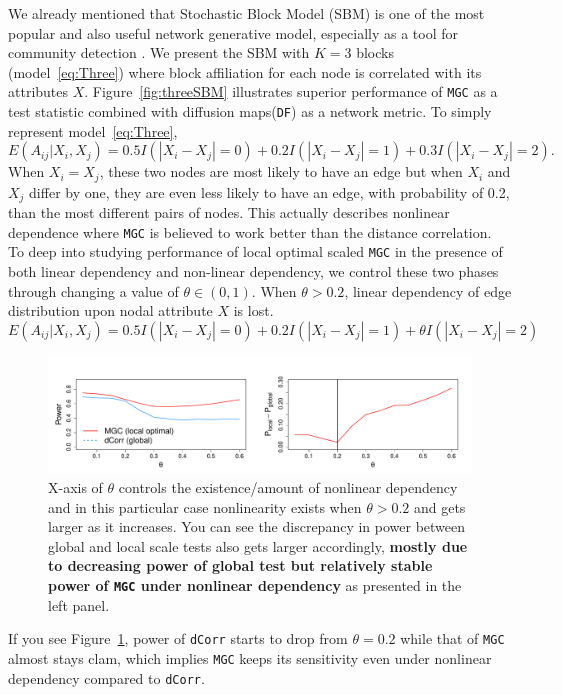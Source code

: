 \documentclass[12pt]{article}
\theoremstyle{definition}
\begin{document}
We already mentioned that Stochastic Block Model (SBM) is one of the most popular and also useful network generative model, especially as a tool for community detection \citep{karrer2011stochastic}. We present the SBM with $K=3$ blocks (model~\ref{eq:Three}) where block affiliation for each node is correlated with its attributes $X$. Figure~\ref{fig:threeSBM} illustrates superior performance of \texttt{MGC} as a test statistic combined with diffusion maps(\texttt{DF}) as a network metric. To simply represent model~\ref{eq:Three},
\begin{equation}
E(A_{ij} | X_{i}, X_{j}) = 0.5 I(|X_{i} - X_{j}| = 0) + 0.2 I(|X_{i} - X_{j}| = 1) + 0.3 I(|X_{i} - X_{j}| = 2).
\end{equation}
When $X_{i} = X_{j}$, these two nodes are most likely to have an edge but when $X_{i}$ and  $X_{j}$ differ by one, they are even less likely to have an edge, with probability of 0.2, than the most different pairs of nodes. This actually describes nonlinear dependence where \texttt{MGC} is believed to work better than the distance correlation. To deep into studying performance of local optimal scaled \texttt{MGC} in the presence of both linear dependency and non-linear dependency, we control these two phases through changing a value of $\theta \in (0, 1)$. When $\theta > 0.2$, linear dependency of edge distribution upon nodal attribute $X$ is lost.
\begin{equation}
E(A_{ij} | X_{i}, X_{j}) = 0.5 I(|X_{i} - X_{j}| = 0) + 0.2 I(|X_{i} - X_{j}| = 1) + \theta I(|X_{i} - X_{j}| = 2)
\end{equation}
\begin{figure}[h]
	\centering
	\includegraphics[width=\linewidth]{../Figure/powerplot_simple.pdf}
	\caption{X-axis of $\theta$ controls the existence/amount of nonlinear dependency and in this particular case nonlinearity exists when $\theta > 0.2$ and gets larger as it increases. You can see the discrepancy in power between global and local scale tests also gets larger accordingly, \textbf{mostly due to decreasing power of global test but relatively stable power of \texttt{MGC} under nonlinear dependency} as presented in the left panel.}
	\label{fig:powerplot}
\end{figure}
If you see Figure~\ref{fig:powerplot}, power of \texttt{dCorr} starts to drop from $\theta = 0.2$ while that of \texttt{MGC} almost stays clam, which implies \texttt{MGC} keeps its sensitivity even under nonlinear dependency compared to \texttt{dCorr}.
\end{document}
